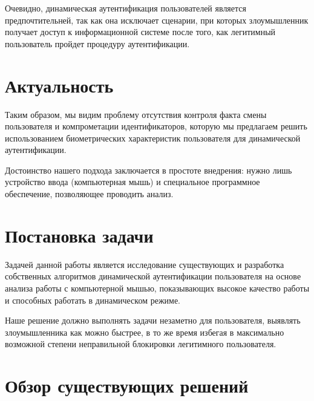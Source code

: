 \documentclass[12pt]{article}
\begin{document}
    \par Очевидно, динамическая аутентификация пользователей является предпочтительней, так как она исключает сценарии, при которых злоумышленник получает доступ к информационной системе после того, как легитимный пользователь пройдет процедуру аутентификации.

    \newpage



    \section{Актуальность}
    \label{sec:Relevance}

    \par Таким образом, мы видим проблему отсутствия контроля факта смены пользователя и компрометации идентификаторов, которую мы предлагаем решить использованием биометрических характеристик пользователя для динамической аутентификации.

    \par Достоинство нашего подхода заключается в простоте внедрения: нужно лишь устройство ввода (компьютерная мышь) и специальное программное обеспечение, позволяющее проводить анализ.

    \newpage



    \section{Постановка задачи}
    \label{sec:FormulationOfProblem}
    
    \par Задачей данной работы является исследование существующих и разработка собственных алгоритмов динамической аутентификации пользователя на основе анализа работы с компьютерной мышью, показывающих высокое качество работы и способных работать в динамическом режиме.

    \par Наше решение должно выполнять задачи незаметно для пользователя, выявлять злоумышленника как можно быстрее, в то же время избегая в максимально возможной степени неправильной блокировки легитимного пользователя.

    \newpage



    \section{Обзор существующих решений}
    \label{sec:Overview}
\end{document}
